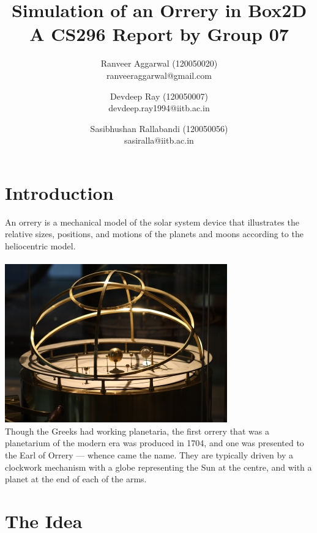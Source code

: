 \documentclass[12pt]{report}
\title{Simulation of an Orrery in Box2D\\ A CS296 Report by Group 07}
\author{Ranveer Aggarwal (120050020) \\ ranveeraggarwal@gmail.com \and Devdeep Ray (120050007) \\ devdeep.ray1994@iitb.ac.in \and Sasibhushan Rallabandi (120050056) \\ sasiralla@iitb.ac.in}
\date{}
\begin{document}
\maketitle

\chapter*{Introduction}
An orrery is a mechanical model of the solar system device that illustrates the relative sizes, positions, and motions of the planets and moons according to the heliocentric model.
\\
\\
\includegraphics[scale=1]{./img/orrery-main.jpg}
\\
Though the Greeks had working planetaria, the first orrery that was a planetarium of the modern era was produced in 1704, and one was presented to the Earl of Orrery — whence came the name. They are typically driven by a clockwork mechanism with a globe representing the Sun at the centre, and with a planet at the end of each of the arms.


\pagebreak

\chapter*{The Idea}
\end{document}
